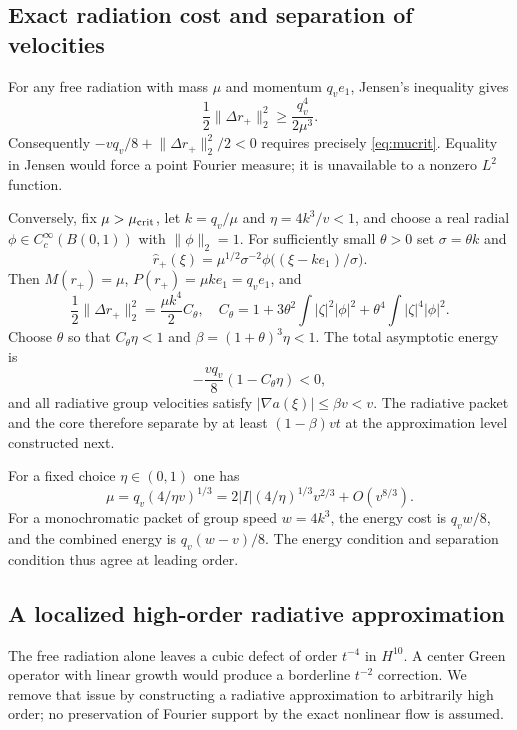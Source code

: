 \documentclass[11pt]{article}
\theoremstyle{definition}
\theoremstyle{remark}
\newcommand{\norm}[1]{\lVert #1\rVert}
\begin{document}
\subsection{Exact radiation cost and separation of velocities}

For any free radiation with mass $\mu$ and momentum $q_v e_1$, Jensen's inequality gives
\begin{equation}\label{eq:jensen}
 \frac12\norm{\Delta r_+}_2^2
 \ge\frac{q_v^4}{2\mu^3}.
\end{equation}
Consequently $-vq_v/8+\norm{\Delta r_+}_2^2/2<0$ requires precisely \eqref{eq:mucrit}. Equality in Jensen would force a point Fourier measure; it is unavailable to a nonzero $L^2$ function.

Conversely, fix $\mu>\mu_{\rm crit}$, let $k=q_v/\mu$ and $\eta=4k^3/v<1$, and choose a real radial $\phi\in C_c^\infty(B(0,1))$ with $\norm\phi_2=1$. For sufficiently small $\theta>0$ set $\sigma=\theta k$ and
\begin{equation}\label{eq:packet}
 \widehat r_+(\xi)=\mu^{1/2}\sigma^{-2}
 \phi\bigl((\xi-ke_1)/\sigma\bigr).
\end{equation}
Then $M(r_+)=\mu$, $P(r_+)=\mu k e_1=q_ve_1$, and
\[
 \frac12\norm{\Delta r_+}_2^2=\frac{\mu k^4}{2}C_\theta,
 \quad C_\theta=1+3\theta^2\int|\zeta|^2|\phi|^2
                  +\theta^4\int|\zeta|^4|\phi|^2.
\]
Choose $\theta$ so that $C_\theta\eta<1$ and $\beta=(1+\theta)^3\eta<1$. The total asymptotic energy is
\begin{equation}\label{eq:negbudget}
 -\frac{vq_v}{8}(1-C_\theta\eta)<0,
\end{equation}
and all radiative group velocities satisfy $|\nabla a(\xi)|\le\beta v<v$. The radiative packet and the core therefore separate by at least $(1-\beta)vt$ at the approximation level constructed next.

For a fixed choice $\eta\in(0,1)$ one has
\[
 \mu=q_v(4/\eta v)^{1/3}
 =2|I|(4/\eta)^{1/3}v^{2/3}+O(v^{8/3}).
\]
For a monochromatic packet of group speed $w=4k^3$, the energy cost is $q_vw/8$, and the combined energy is $q_v(w-v)/8$. The energy condition and separation condition thus agree at leading order.

\subsection{A localized high-order radiative approximation}

The free radiation alone leaves a cubic defect of order $t^{-4}$ in $H^{10}$. A center Green operator with linear growth would produce a borderline $t^{-2}$ correction. We remove that issue by constructing a radiative approximation to arbitrarily high order; no preservation of Fourier support by the exact nonlinear flow is assumed.
\end{document}
